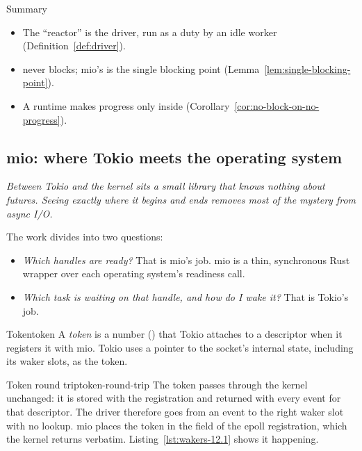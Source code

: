 \begin{quotebox}{Summary}
    \begin{itemize}
        \item The ``reactor'' is the driver, run as a duty by an idle worker (Definition~\ref{def:driver}).
        \item {} never blocks; mio's  is the single blocking point (Lemma~\ref{lem:single-blocking-point}).
        \item A  runtime makes progress only inside  (Corollary~\ref{cor:no-block-on-no-progress}).
    \end{itemize}
\end{quotebox}

\subsection{mio: where Tokio meets the operating system}
\label{sec:wakers-ch12}

\textit{Between Tokio and the kernel sits a small library that knows nothing about futures. Seeing exactly where it begins and ends removes most of the mystery from async I/O.}

The work divides into two questions:

\begin{itemize}
    \item \emph{Which handles are ready?} That is mio's job. mio is a thin, synchronous Rust wrapper over each operating system's readiness call.
    \item \emph{Which task is waiting on that handle, and how do I wake it?} That is Tokio's job.
\end{itemize}

\begin{definition}{Token}{token}
    A \emph{token} is a number () that Tokio attaches to a descriptor when it registers it with mio. Tokio uses a pointer to the socket's internal state, including its waker slots, as the token.
\end{definition}

\begin{lemma}{Token round trip}{token-round-trip}
    The token passes through the kernel unchanged: it is stored with the registration and returned with every event for that descriptor. The driver therefore goes from an event to the right waker slot with no lookup.
    \why mio places the token in the  field of the epoll registration, which the kernel returns verbatim. Listing~\ref{lst:wakers-12.1} shows it happening.
\end{lemma}

